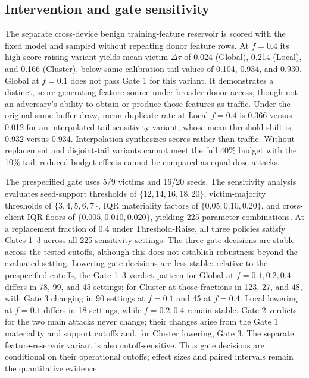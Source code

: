 \subsection{Intervention and gate sensitivity}
The separate cross-device benign training-feature reservoir is scored with the fixed model and sampled without repeating donor feature rows. At $f{=}0.4$ its high-score raising variant yields mean victim $\Delta\tau$ of 0.024 (Global), 0.214 (Local), and 0.166 (Cluster), below same-calibration-tail values of 0.104, 0.934, and 0.930. Global at $f{=}0.1$ does not pass Gate 1 for this variant. It demonstrates a distinct, score-generating feature source under broader donor access, though not an adversary's ability to obtain or produce those features as traffic. Under the original same-buffer draw, mean duplicate rate at Local $f{=}0.4$ is 0.366 versus 0.012 for an interpolated-tail sensitivity variant, whose mean threshold shift is 0.932 versus 0.934. Interpolation synthesizes scores rather than traffic. Without-replacement and disjoint-tail variants cannot meet the full 40\% budget with the 10\% tail; reduced-budget effects cannot be compared as equal-dose attacks.

The prespecified gate uses 5/9 victims and 16/20 seeds. The sensitivity analysis evaluates seed-support thresholds of $\{12,14,16,18,20\}$, victim-majority thresholds of $\{3,4,5,6,7\}$, IQR materiality factors of $\{0.05,0.10,0.20\}$, and cross-client IQR floors of $\{0.005,0.010,0.020\}$, yielding 225 parameter combinations. At a replacement fraction of 0.4 under Threshold-Raise, all three policies satisfy Gates 1--3 across all 225 sensitivity settings. The three gate decisions are stable across the tested cutoffs, although this does not establish robustness beyond the evaluated setting. Lowering gate decisions are less stable: relative to the prespecified cutoffs, the Gate 1--3 verdict pattern for Global at $f{=}0.1,0.2,0.4$ differs in 78, 99, and 45 settings; for Cluster at those fractions in 123, 27, and 48, with Gate 3 changing in 90 settings at $f{=}0.1$ and 45 at $f{=}0.4$. Local lowering at $f{=}0.1$ differs in 18 settings, while $f{=}0.2,0.4$ remain stable. Gate 2 verdicts for the two main attacks never change; their changes arise from the Gate 1 materiality and support cutoffs and, for Cluster lowering, Gate 3. The separate feature-reservoir variant is also cutoff-sensitive. Thus gate decisions are conditional on their operational cutoffs; effect sizes and paired intervals remain the quantitative evidence.

